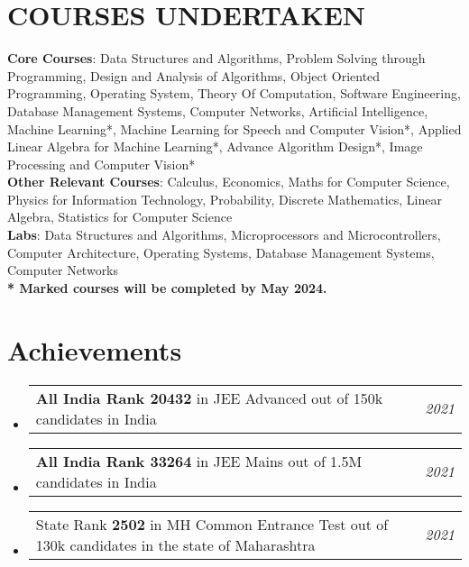 \documentclass[a4paper,11pt]{article}
\makeatletter
\newcommand{\resumePOR}[3]{
\vspace{0.5mm}\item
    \begin{tabular*}{0.97\textwidth}[t]{l@{\extracolsep{\fill}}r}
        \textbf{#1}\hspace{0.3mm}#2 & \textit{\small{#3}}
    \end{tabular*}
    \vspace{-2mm}
}
\newcommand{\resumeSubHeadingListStart}{\begin{itemize}[leftmargin=*,labelsep=0mm]}
\newcommand{\resumeSubHeadingListEnd}{\end{itemize}\vspace{2mm}}
\makeatother
\begin{document}
\section{\textbf{COURSES UNDERTAKEN}}
 \begin{itemize}[leftmargin=0.05in, label={}]
    \small{\item{
     \textbf{Core Courses}{: Data Structures and Algorithms, Problem Solving through Programming, Design and Analysis of
        Algorithms, Object Oriented Programming, Operating System, Theory Of Computation, Software Engineering, Database Management Systems, Computer Networks, Artificial Intelligence, Machine Learning*, Machine Learning for Speech and Computer Vision*, Applied Linear Algebra for Machine Learning*, Advance Algorithm Design*, Image Processing and Computer Vision*} \newline \\
    \textbf{Other Relevant Courses}{: Calculus, Economics, Maths for Computer Science, Physics for Information Technology,
        Probability, Discrete Mathematics, Linear Algebra, Statistics for Computer Science} \newline \\
    \textbf{Labs}{: Data Structures and Algorithms, Microprocessors and Microcontrollers, Computer Architecture, Operating Systems, Database Management Systems, Computer Networks} \newline \\
    \textbf{* Marked courses will be completed by May 2024.}{} \\
    }}
 \end{itemize}
 \vspace{-16pt}

\section{\textbf{Achievements}}
\vspace{-0.4mm}
\resumeSubHeadingListStart
\resumePOR{ } %
    {\textbf{All India Rank 20432} in JEE Advanced out of 150k candidates in India} %
    {2021} %

\resumePOR{ } %
    {\textbf{All India Rank 33264} in JEE Mains out of 1.5M candidates in India} %
    {2021} %
\resumePOR{ } %
    {State Rank \textbf{2502} in MH Common Entrance Test out of 130k candidates in the state of Maharashtra} %
    {2021} %
\resumeSubHeadingListEnd
\vspace{-5mm}
\end{document}
